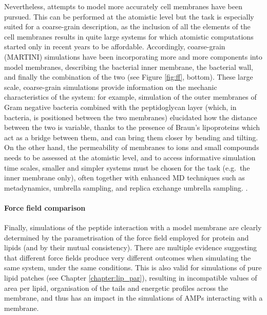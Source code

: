 Nevertheless, attempts to model more accurately cell membranes have been pursued. This can be performed at the atomistic level \citep{Piggot2011}
but the task is especially suited for a coarse-grain description, as the inclusion of all the elements of the cell membranes results in quite large systems for which atomistic computations started only in recent years to be affordable.
%
Accordingly, coarse-grain (MARTINI) simulations have been incorporating more and more components into model membranes, describing the bacterial inner membrane, the bacterial wall, and finally the combination of the two \citep{Khalid2019} (see Figure \ref{fig:ff}, bottom).
%
These large scale, coarse-grain simulations provide information on the mechanic characteristics of the system: for example, simulation of the outer membranes of Gram negative bacteria combined with the peptidoglycan layer (which, in bacteria, is positioned between the two membranes) elucidated how the distance between the two is variable, thanks to the presence of Braun's lipoproteins \citep{Asmar2018} which act as a bridge between them, and can bring them closer by bending and tilting.
%
On the other hand, the permeability of membranes to ions and small compounds needs to be assessed at the atomistic level, and to access informative simulation time scales, smaller and simpler systems must be chosen for the task (e.g.\ the inner membrane only), often together with enhanced MD techniques such as metadynamics, umbrella sampling, and replica exchange umbrella sampling. \citep{Sun2016,Piggot2011,Carpenter2016,Pokhrel2018}.

\paragraph{Force field comparison} Finally, simulations of the peptide interaction with a model membrane are clearly determined by the parametrisation of the force field employed for protein and lipids (and by their mutual consistency).
%
There are multiple evidence suggesting that different force fields produce very different outcomes when simulating the same system, under the same conditions. This is also valid for simulations of pure lipid patches (see Chapter \ref{chapter:lip_par}), resulting in incompatible values of area per lipid, organisation of the tails and energetic profiles across the membrane, and thus has an impact in the simulations of AMPs interacting with a membrane.

